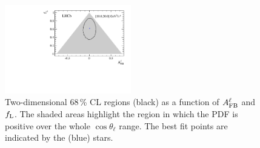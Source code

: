 \begin{figure}[h]
\includegraphics[width=0.49\textwidth]{Lmumu/figs/paper/figure10e.pdf}
\caption{Two-dimensional 68\,\% CL regions (black) as a
  function of $A_{\rm FB}^\ell$ and $f_{\rm L}$.  The shaded areas
  highlight the region in which the PDF is positive over the whole 
  $\cos \theta_{\ell}$ range. The best fit points are indicated by the (blue) stars. }
\label{fig:contours}
\end{figure}
